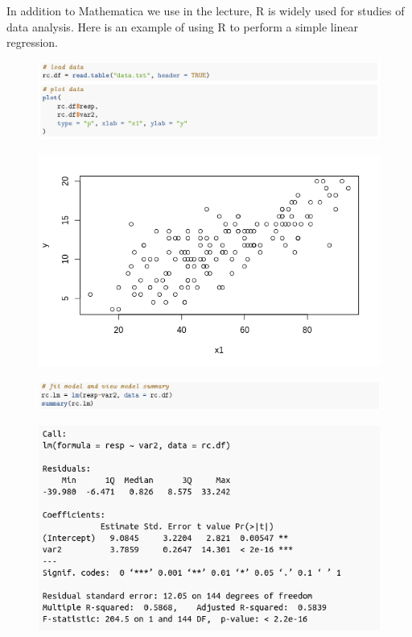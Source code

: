 In addition to Mathematica we use in the lecture, R is widely used for studies of data analysis. Here is an example of using R to perform a simple linear regression.

\begin{figure}[H]
	\centering
	\includegraphics[width=\linewidth]{./images/s7fig4.png}
\end{figure}
\begin{figure}[H]
	\centering
	\includegraphics[width=12cm]{./images/s7fig5.png}
\end{figure}
\begin{figure}[H]
	\centering
	\includegraphics[width=\linewidth]{./images/s7fig6.png}
\end{figure}
\begin{figure}[H]
	\includegraphics[width=12cm]{./images/s7fig2.png}
\end{figure}
